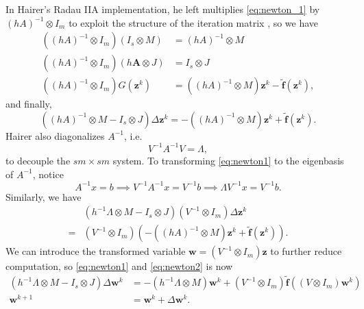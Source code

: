 \documentclass[a4paper,9pt]{article}
\theoremstyle{definition}
\theoremstyle{remark}
\begin{document}
In Hairer's Radau IIA implementation, he left multiplies \cref{eq:newton_1} by
$(hA)^{-1} \otimes I_m$ to exploit the structure of the iteration matrix
\cite{hairer1999stiff}, so we have
\begin{align}
  ((hA)^{-1} \otimes I_m)(I_s \otimes M) &= (hA)^{-1} \otimes M \\
  ((hA)^{-1} \otimes I_m)(h\bm{A}\otimes J) &= I_s\otimes J \\
  ((hA)^{-1} \otimes I_m)G(\bm{z}^k) &= ((hA)^{-1} \otimes M) \bm{z}^k -
  \tilde{\bm{f}}(\bm{z}^k),
\end{align}
and finally,
\begin{equation} \label{eq:newton1}
  ((hA)^{-1} \otimes M - I_s\otimes J) \Delta \bm{z}^k = -((hA)^{-1} \otimes M)
  \bm{z}^k + \tilde{\bm{f}}(\bm{z}^k).
\end{equation}
Hairer also diagonalizes $A^{-1}$, i.e.
\begin{equation}
  V^{-1}A^{-1}V = \Lambda,
\end{equation}
to decouple the $sm \times sm$ system. To transforming \cref{eq:newton1} to
the eigenbasis of $A^{-1}$, notice
\begin{equation}
  A^{-1}x = b \implies V^{-1}A^{-1}x = V^{-1}b \implies \Lambda V^{-1}x =
  V^{-1}b.
\end{equation}
Similarly, we have
\begin{align}
  &(h^{-1} \Lambda \otimes M - I_s\otimes J) (V^{-1}\otimes I_m)\Delta\bm{z}^k\\
  =& (V^{-1}\otimes I_m)(-((hA)^{-1} \otimes M)
  \bm{z}^k + \tilde{\bm{f}}(\bm{z}^k)).
\end{align}
We can introduce the transformed variable $\bm{w} = (V^{-1}\otimes I_m) \bm{z}$
to further reduce computation, so \cref{eq:newton1} and \cref{eq:newton2} is now
\begin{align} \label{eq:newton2}
  (h^{-1} \Lambda \otimes M - I_s\otimes J) \Delta\bm{w}^k
  &= -(h^{-1} \Lambda \otimes M) \bm{w}^k +
  (V^{-1}\otimes I_m)\tilde{\bm{f}}((V\otimes I_m)\bm{w}^k) \\
  \bm{w}^{k+1} &= \bm{w}^{k} + \Delta \bm{w}^k.
\end{align}



\end{document}
